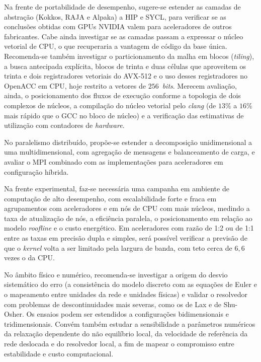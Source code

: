 Na frente de portabilidade de desempenho, sugere-se estender as camadas de abstração (Kokkos, RAJA e Alpaka) a HIP e SYCL, para verificar se as conclusões obtidas com GPUs NVIDIA valem para aceleradores de outros fabricantes.
Cabe ainda investigar se as camadas passam a expressar o núcleo vetorial de CPU, o que recuperaria a vantagem de código da base única.
Recomenda-se também investigar o particionamento da malha em blocos (\textit{tiling}), a busca antecipada explícita, blocos de trinta e duas células que aproveitem os trinta e dois registradores vetoriais do AVX-512 e o uso desses registradores no OpenACC em CPU, hoje restrito a vetores de $256$~\textit{bits}.
Merecem avaliação, ainda, o posicionamento dos fluxos de execução conforme a topologia de dois complexos de núcleos, a compilação do núcleo vetorial pelo \textit{clang} (de \(13\%\) a \(16\%\) mais rápido que o GCC no bloco de núcleo) e a verificação das estimativas de utilização com contadores de \textit{hardware}.

No paralelismo distribuído, propõe-se estender a decomposição unidimensional a uma multidimensional, com agregação de mensagens e balanceamento de carga, e avaliar o MPI combinado com as implementações para aceleradores em configuração híbrida.

Na frente experimental, faz-se necessária uma campanha em ambiente de computação de alto desempenho, com escalabilidade forte e fraca em agrupamentos com aceleradores e em nós de CPU com mais núcleos, medindo a taxa de atualização de nós, a eficiência paralela, o posicionamento em relação ao modelo \textit{roofline} e o custo energético.
Em aceleradores com razão de 1:2 ou de 1:1 entre as taxas em precisão dupla e simples, será possível verificar a previsão de que o \textit{kernel} volta a ser limitado pela largura de banda, com teto cerca de \(6{,}6\) vezes o da CPU.

No âmbito físico e numérico, recomenda-se investigar a origem do desvio sistemático do erro (a consistência do modelo discreto com as equações de Euler e o mapeamento entre unidades da rede e unidades físicas) e validar o resolvedor com problemas de descontinuidades mais severas, como os de Lax e de Shu-Osher.
Os ensaios podem ser estendidos a configurações bidimensionais e tridimensionais.
Convém também estudar a sensibilidade a parâmetros numéricos da relaxação dependente do não equilíbrio local, da velocidade de referência da rede deslocada e do resolvedor local, a fim de mapear o compromisso entre estabilidade e custo computacional.
